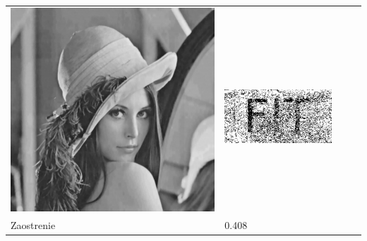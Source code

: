 \begin{table}[h]
\begin{tabular}{llcc}
\begin{minipage}[c]{.1\textwidth}
  \includegraphics[scale=0.1]{obrazky/despeckle}
\end{minipage} &
\begin{minipage}[c]{.15\textwidth}
\ 
  \includegraphics[scale=0.25]{obrazky/despeckle-wm}
\end{minipage} \\
Zaostrenie                             & 0.408 &
\begin{minipage}[c]{.1\textwidth}
\ 

\end{minipage}
\end{tabular}
\end{table}
